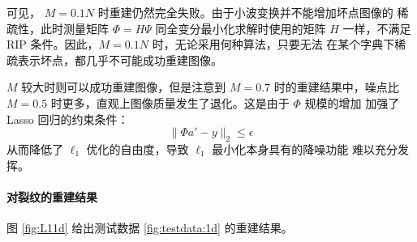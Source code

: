 可见， $M = 0.1 N$ 时重建仍然完全失败。由于小波变换并不能增加坏点图像的
稀疏性，此时测量矩阵 $\Phi = H \Psi$ 同全变分最小化求解时使用的矩阵 $H$
一样，不满足 RIP 条件。因此，$M = 0.1N$ 时，无论采用何种算法，只要无法
在某个字典下稀疏表示坏点，都几乎不可能成功重建图像。

$M$ 较大时则可以成功重建图像，但是注意到 $M=0.7$ 时的重建结果中，噪点比
$M=0.5$ 时更多，直观上图像质量发生了退化。这是由于 $\Phi$ 规模的增加
加强了 Lasso 回归的约束条件：
\begin{equation}
\|\Phi a' - y\|_2 \leq \epsilon
\end{equation}
从而降低了 $\ell_1$ 优化的自由度，导致 $\ell_1$ 最小化本身具有的降噪功能
难以充分发挥。

\paragraph{对裂纹的重建结果} 图 \ref{fig:L11d} 给出测试数据
\ref{fig:testdata:1d} 的重建结果。

